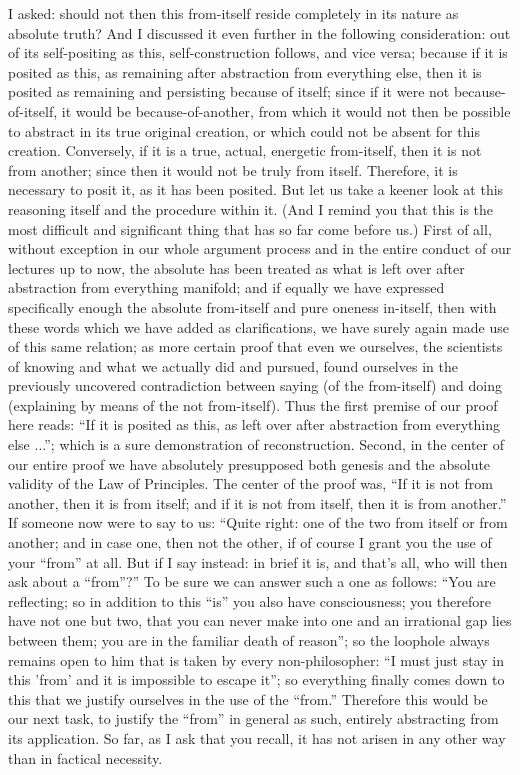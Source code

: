 I asked: should not then this from-itself reside completely
in its nature as absolute truth?
And I discussed it even further in the following consideration:
out of its self-positing as this,
self-construction follows, and vice versa;
because if it is posited as this,
as remaining after abstraction from everything else,
then it is posited as remaining and persisting because of itself;
since if it were not because-of-itself,
it would be because-of-another,
from which it would not then be possible to abstract
in its true original creation,
or which could not be absent for this creation.
Conversely, if it is a true, actual, energetic from-itself,
then it is not from another;
since then it would not be truly from itself.
Therefore, it is necessary to posit it, as it has been posited.
But let us take a keener look at this reasoning itself
and the procedure within it.
(And I remind you that this is the most difficult
and significant thing that has so far come before us.)
First of all, without exception in our whole argument process
and in the entire conduct of our lectures up to now,
the absolute has been treated as what is left over
after abstraction from everything manifold;
and if equally we have expressed specifically enough
the absolute from-itself and pure oneness in-itself,
then with these words which we have added as clarifications,
we have surely again made use of this same relation;
as more certain proof that even we ourselves,
the scientists of knowing and what we actually did and pursued,
found ourselves in the previously uncovered contradiction
between saying (of the from-itself)
and doing (explaining by means of the not from-itself).
Thus the first premise of our proof here reads:
“If it is posited as this,
as left over after abstraction
from everything else ...”;
which is a sure demonstration of reconstruction.
Second, in the center of our entire proof
we have absolutely presupposed both genesis
and the absolute validity of the Law of Principles.
The center of the proof was,
“If it is not from another, then it is from itself;
and if it is not from itself, then it is from another.”
If someone now were to say to us:
“Quite right: one of the two
from itself or from another;
and in case one, then not the other,
if of course I grant you the use of your “from” at all.
But if I say instead:
in brief it is, and that's all,
who will then ask about a “from”?”
To be sure we can answer such a one as follows:
“You are reflecting; so in addition to this “is”
you also have consciousness;
you therefore have not one but two,
that you can never make into one
and an irrational gap lies between them;
you are in the familiar death of reason”;
so the loophole always remains open to him
that is taken by every non-philosopher:
“I must just stay in this 'from'
and it is impossible to escape it”;
so everything finally comes down to this
that we justify ourselves in the use of the “from.”
Therefore this would be our next task,
to justify the “from” in general as such,
entirely abstracting from its application.
So far, as I ask that you recall,
it has not arisen in any other way
than in factical necessity.

